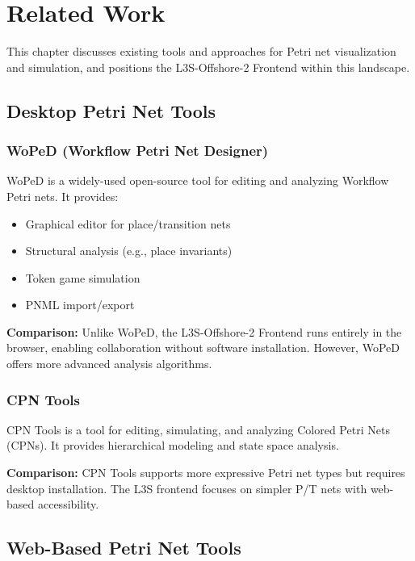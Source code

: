 \chapter{Related Work}
\label{chap:related-work}

This chapter discusses existing tools and approaches for Petri net visualization and simulation, and positions the L3S-Offshore-2 Frontend within this landscape.

\section{Desktop Petri Net Tools}
\label{sec:desktop-tools}

\subsection{WoPeD (Workflow Petri Net Designer)}

WoPeD is a widely-used open-source tool for editing and analyzing Workflow Petri nets. It provides:

\begin{itemize}
    \item Graphical editor for place/transition nets
    \item Structural analysis (e.g., place invariants)
    \item Token game simulation
    \item PNML import/export
\end{itemize}

\textbf{Comparison:} Unlike WoPeD, the L3S-Offshore-2 Frontend runs entirely in the browser, enabling collaboration without software installation. However, WoPeD offers more advanced analysis algorithms.

\subsection{CPN Tools}

CPN Tools is a tool for editing, simulating, and analyzing Colored Petri Nets (CPNs). It provides hierarchical modeling and state space analysis.

\textbf{Comparison:} CPN Tools supports more expressive Petri net types but requires desktop installation. The L3S frontend focuses on simpler P/T nets with web-based accessibility.

\section{Web-Based Petri Net Tools}
\label{sec:web-tools}


